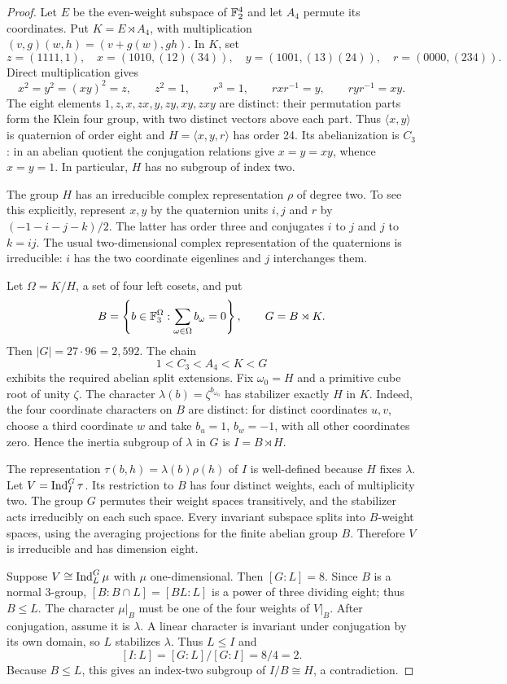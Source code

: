 \begin{proof}
Let $E$ be the even-weight subspace of $\mathbb F_2^4$ and let $A_4$
permute its coordinates. Put $K=E\rtimes A_4$, with multiplication
$(v,g)(w,h)=(v+g(w),gh)$. In $K$, set
\[
z=(1111,1),\quad
x=(1010,(12)(34)),\quad
y=(1001,(13)(24)),\quad
r=(0000,(234)).
\]
Direct multiplication gives
\[
x^2=y^2=(xy)^2=z,\qquad
z^2=1,\qquad r^3=1,\qquad
rxr^{-1}=y,\qquad ryr^{-1}=xy.
\]
The eight elements $1,z,x,zx,y,zy,xy,zxy$ are distinct:
their permutation parts form the Klein four group, with two
distinct vectors above each part. Thus $\langle x,y\rangle$
is quaternion of order eight and
$H=\langle x,y,r\rangle$ has order 24.
Its abelianization is $C_3$: in an abelian quotient the
conjugation relations give $x=y=xy$, whence $x=y=1$.
In particular, $H$ has no subgroup of index two.

The group $H$ has an irreducible complex representation $\rho$
of degree two. To see this explicitly, represent $x,y$ by the
quaternion units $i,j$ and $r$ by
$(-1-i-j-k)/2$. The latter has order three and conjugates
$i$ to $j$ and $j$ to $k=ij$.
The usual two-dimensional complex representation of the
quaternions is irreducible: $i$ has the two coordinate
eigenlines and $j$ interchanges them.

Let $\Omega=K/H$, a set of four left cosets, and put
\[
B=\left\{b\in\mathbb F_3^\Omega:\sum_{\omega\in\Omega}b_\omega=0\right\},
\qquad G=B\rtimes K.
\]
Then $|G|=27\cdot96=2,592$. The chain
\[
1<C_3<A_4<K<G
\]
exhibits the required abelian split extensions.
Fix $\omega_0=H$ and a primitive cube root of unity $\zeta$.
The character $\lambda(b)=\zeta^{b_{\omega_0}}$ has stabilizer
exactly $H$ in $K$. Indeed, the four coordinate characters on
$B$ are distinct: for distinct coordinates $u,v$, choose a
third coordinate $w$ and take $b_u=1$, $b_w=-1$, with all
other coordinates zero. Hence the inertia subgroup of
$\lambda$ in $G$ is $I=B\rtimes H$.

The representation
$\tau(b,h)=\lambda(b)\rho(h)$ of $I$ is well-defined because
$H$ fixes $\lambda$. Let $V=\operatorname{Ind}_I^G\tau$. Its restriction
to $B$ has four distinct weights, each of multiplicity two.
The group $G$ permutes their weight spaces transitively,
and the stabilizer acts irreducibly on each such space.
Every invariant subspace splits into $B$-weight spaces,
using the averaging projections for the finite abelian
group $B$. Therefore $V$ is irreducible and has dimension
eight.

Suppose $V\cong\operatorname{Ind}_L^G\mu$ with $\mu$ one-dimensional.
Then $[G:L]=8$. Since $B$ is a normal 3-group,
$[B:B\cap L]=[BL:L]$ is a power of three dividing eight;
thus $B\le L$. The character $\mu|_B$ must be one of the
four weights of $V|_B$. After conjugation, assume it is
$\lambda$. A linear character is invariant under
conjugation by its own domain, so $L$ stabilizes $\lambda$.
Thus $L\le I$ and
\[
[I:L]=[G:L]/[G:I]=8/4=2.
\]
Because $B\le L$, this gives an index-two subgroup of
$I/B\cong H$, a contradiction.
\end{proof}

